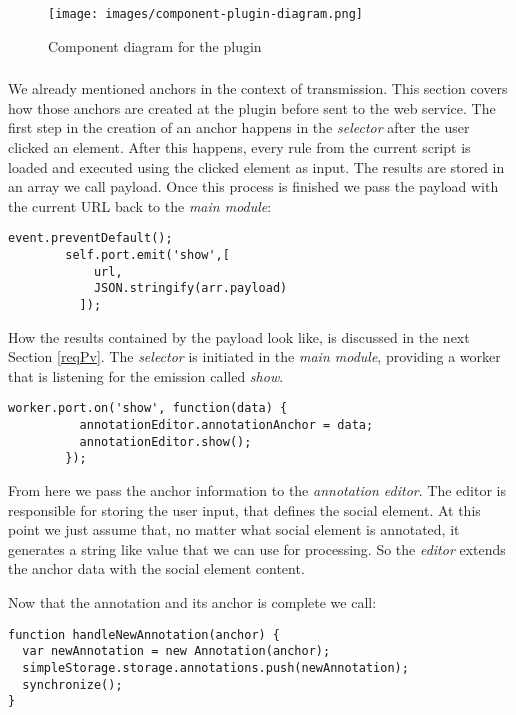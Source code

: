 \begin{figure}
	\texttt{[image: images/component-plugin-diagram.png]}
	\caption{Component diagram for the plugin}
	\label{component-plugin-diagram}
\end{figure}

\subsubsection[Creating Anchors]{\reqPiv}\label{reqPiv}
We already mentioned anchors in the context of transmission. This section covers how those anchors are created at the plugin before sent to the web service. 
The first step in the creation of an anchor happens in the \emph{selector} after the user clicked an element. After this happens, every rule from the current script is loaded and executed using the clicked element as input. The results are stored in an array we call payload. Once this process is finished we pass the payload with the current URL back to the \emph{main module}:

\begin{lstlisting}
event.preventDefault();    
        self.port.emit('show',[
            url,
            JSON.stringify(arr.payload)
          ]);
\end{lstlisting}
How the results contained by the payload look like, is discussed in the next Section \ref{reqPv}. 
The \textit{selector} is initiated in the \textit{main module}, providing a worker that is listening for the emission called \textit{show}. 
\begin{lstlisting}
worker.port.on('show', function(data) {
          annotationEditor.annotationAnchor = data;
          annotationEditor.show();
        });
\end{lstlisting}
From here we pass the anchor information to the \textit{annotation editor}. The editor is responsible for storing the user input, that defines the social element. At this point we just assume that, no matter what social element is annotated, it generates a string like value that we can use for processing. So the \textit{editor} extends the anchor data with the social element content. 

Now that the annotation and its anchor is complete we call:
\begin{lstlisting}
function handleNewAnnotation(anchor) {
  var newAnnotation = new Annotation(anchor);  
  simpleStorage.storage.annotations.push(newAnnotation);
  synchronize();
}
\end{lstlisting}

